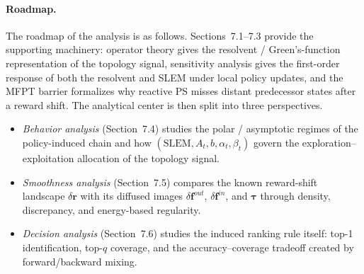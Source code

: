 \documentclass[10pt,a4paper]{article}
\begin{document}
\paragraph{Roadmap.}
The roadmap of the analysis is as follows.
Sections~7.1--7.3 provide the supporting machinery: operator theory gives the resolvent / Green's-function representation of the topology signal, sensitivity analysis gives the first-order response of both the resolvent and SLEM under local policy updates, and the MFPT barrier formalizes why reactive PS misses distant predecessor states after a reward shift.
The analytical center is then split into three perspectives.
\begin{itemize}
  \item \emph{Behavior analysis} (Section~7.4) studies the polar / asymptotic regimes of the policy-induced chain and how $(\mathrm{SLEM}, A_t, b, \alpha_t, \beta_t)$ govern the exploration--exploitation allocation of the topology signal.
  \item \emph{Smoothness analysis} (Section~7.5) compares the known reward-shift landscape $\delta\mathbf{r}$ with its diffused images $\delta\mathbf{f}^{out}$, $\delta\mathbf{f}^{in}$, and $\boldsymbol{\tau}$ through density, discrepancy, and energy-based regularity.
  \item \emph{Decision analysis} (Section~7.6) studies the induced ranking rule itself: top-1 identification, top-$q$ coverage, and the accuracy--coverage tradeoff created by forward/backward mixing.
\end{itemize}
\end{document}
